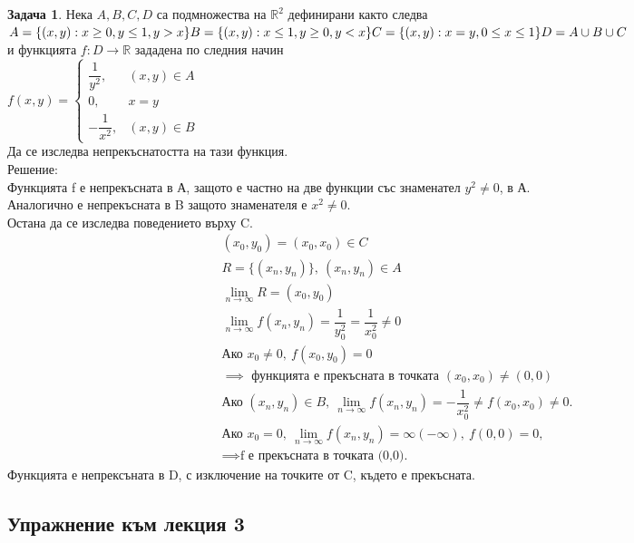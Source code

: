 \documentclass[a4paper,fleqn,12pt]{article}
\theoremstyle{definition}
\newtheorem{task}{Задача}[subsection]
\begin{document}
\begin{task}
Нека $A,B,C,D$ са подмножества на $\mathbb{R}^2$ дефинирани както следва \\
$
A = \{ (x,y): x \geq 0, y \leq 1, y>x \} \\
B = \{ (x,y): x \leq 1, y \geq 0, y<x \} \\
C = \{ (x,y): x = y , 0 \leq x \leq 1 \} \\
D = A \cup B \cup C
$ \\
и функцията $f: D \to \mathbb{R} $ зададена по следния начин \\
$f(x,y) = 
\begin{cases}
\dfrac{1}{y^2}, & (x,y)\in A \\
0, & x = y \\
-\dfrac{1}{x^2}, & (x,y)\in B
\end{cases}$\\ 
Да се изследва непрекъснатостта на тази функция. \\
Решение:\\
Функцията f е непрекъсната в А, защото е частно на две функции със знаменател $y^2\neq 0$, в А.\\
Аналогично е непрекъсната в B защото знаменателя е $x^2 \neq 0$.\\
Остана да се изследва поведението върху C. \\
\begin{gather*}
(x_0,y_0) = (x_0, x_0) \in C \\
R = \{ (x_n , y_n) \},\ (x_n , y_n) \in A \\
\lim\limits_{n \to \infty} R = (x_0, y_0)\\
\lim\limits_{n \to \infty} f(x_n,y_n) = \dfrac{1}{y_0 ^2} = \dfrac{1}{x_0 ^2} \neq 0\\
\text{Ако } x_0 \neq 0, \ f(x_0,y_0) = 0 \\
\implies \text{ функцията е прекъсната в точката } (x_0, x_0) \neq (0,0) \\
\text{Ако } (x_n , y_n) \in B,\ \lim\limits_{n \to \infty} f(x_n,y_n) = - \dfrac{1}{x_0 ^2} \neq f(x_0, x_0) \neq 0. \\
\text{Ако } x_0 = 0,\ \lim\limits_{n \to \infty} f(x_n,y_n) = \infty(-\infty),\ f(0,0) = 0,\\
\implies \text{f е прекъсната в точката (0,0).} 
\end{gather*}
Функцията е непрексъната в D, с изключение на точките от C, където е прекъсната. 
\end{task}

\newpage
\subsection{Упражнение към лекция 3}
\end{document}
